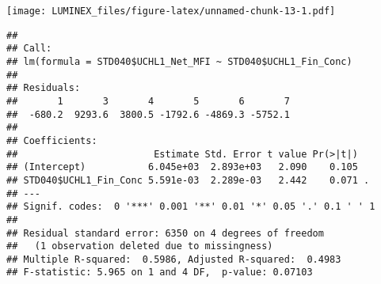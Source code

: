 \documentclass[]{article}
\newenvironment{Shaded}{\begin{snugshade}}{\end{snugshade}}
\newcommand{\CommentTok}[1]{\textcolor[rgb]{0.56,0.35,0.01}{\textit{#1}}}
\newcommand{\KeywordTok}[1]{\textcolor[rgb]{0.13,0.29,0.53}{\textbf{#1}}}
\newcommand{\NormalTok}[1]{#1}
\newcommand{\OperatorTok}[1]{\textcolor[rgb]{0.81,0.36,0.00}{\textbf{#1}}}
\newcommand{\StringTok}[1]{\textcolor[rgb]{0.31,0.60,0.02}{#1}}
\begin{document}
\texttt{[image: LUMINEX\_files/figure-latex/unnamed-chunk-13-1.pdf]}

\begin{Shaded}
\end{Shaded}

\begin{verbatim}
## 
## Call:
## lm(formula = STD040$UCHL1_Net_MFI ~ STD040$UCHL1_Fin_Conc)
## 
## Residuals:
##       1       3       4       5       6       7 
##  -680.2  9293.6  3800.5 -1792.6 -4869.3 -5752.1 
## 
## Coefficients:
##                        Estimate Std. Error t value Pr(>|t|)  
## (Intercept)           6.045e+03  2.893e+03   2.090    0.105  
## STD040$UCHL1_Fin_Conc 5.591e-03  2.289e-03   2.442    0.071 .
## ---
## Signif. codes:  0 '***' 0.001 '**' 0.01 '*' 0.05 '.' 0.1 ' ' 1
## 
## Residual standard error: 6350 on 4 degrees of freedom
##   (1 observation deleted due to missingness)
## Multiple R-squared:  0.5986, Adjusted R-squared:  0.4983 
## F-statistic: 5.965 on 1 and 4 DF,  p-value: 0.07103
\end{verbatim}
\end{document}
